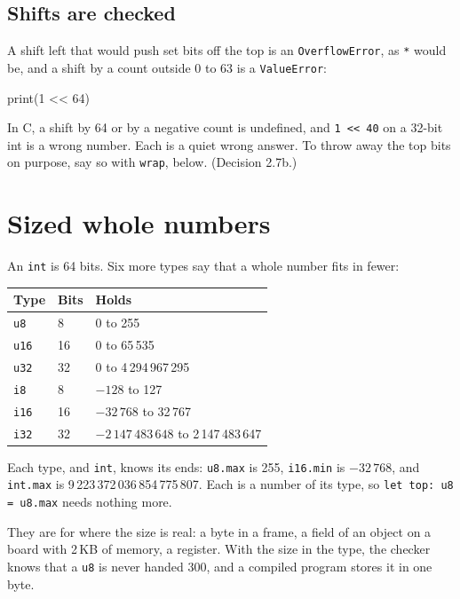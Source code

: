 \subsection{Shifts are checked}

A shift left that would push set bits off the top is an
\verb|OverflowError|, as \verb|*| would be, and a shift by a count
outside 0 to 63 is a \verb|ValueError|:

\begin{zeno}[fails=yes]
print(1 << 64)
\end{zeno}

In C, a shift by 64 or by a negative count is undefined, and
\verb|1 << 40| on a 32-bit int is a wrong number. Each is a quiet wrong
answer. To throw away the top bits on purpose, say so with
\verb|wrap|, below. (Decision 2.7b.)

\section{Sized whole numbers}

An \verb|int| is 64 bits. Six more types say that a whole number fits
in fewer:

\begin{center}
\begin{tabular}{lll}
\toprule
Type & Bits & Holds \\
\midrule
\verb|u8| & 8 & 0 to 255 \\
\verb|u16| & 16 & 0 to 65\,535 \\
\verb|u32| & 32 & 0 to 4\,294\,967\,295 \\
\verb|i8| & 8 & $-128$ to 127 \\
\verb|i16| & 16 & $-32\,768$ to 32\,767 \\
\verb|i32| & 32 & $-2\,147\,483\,648$ to 2\,147\,483\,647 \\
\bottomrule
\end{tabular}
\end{center}

Each type, and \verb|int|, knows its ends: \verb|u8.max| is 255,
\verb|i16.min| is $-32\,768$, and \verb|int.max| is
9\,223\,372\,036\,854\,775\,807. Each is a number of its type, so
\verb|let top: u8 = u8.max| needs nothing more.

They are for where the size is real: a byte in a frame, a field of an
object on a board with 2\,KB of memory, a register. With the size in
the type, the checker knows that a \verb|u8| is never handed 300, and
a compiled program stores it in one byte.

